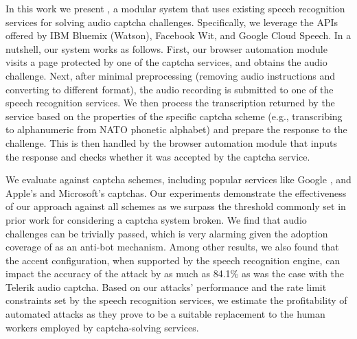 In this work we present \system, a modular system that uses existing speech recognition services
for solving audio captcha challenges. Specifically, we leverage the
APIs offered by IBM Bluemix (Watson), Facebook Wit, and Google Cloud Speech. In a nutshell, our system works as
follows. First, our browser automation module visits a page protected by one of the captcha services,
and obtains the audio challenge. Next, after minimal preprocessing (removing audio instructions and 
converting to different format), the audio recording is submitted 
to one of the speech recognition services. We then process the transcription returned by the service
based on the properties of the specific captcha scheme (e.g., transcribing to alphanumeric 
from NATO phonetic alphabet) and prepare the response to the challenge. This is then handled by
the browser automation module that inputs the response and checks whether it was accepted by the captcha
service.

We evaluate \system against \no captcha schemes, including popular services like Google \re,
and Apple's and Microsoft's captchas. Our experiments demonstrate the effectiveness of our approach
against all schemes as we surpass the threshold commonly set in prior work for considering
a captcha system broken. We find that \re audio challenges can be trivially passed, which is 
very alarming given the adoption coverage of \re as an anti-bot mechanism. Among other results, 
we also found that the accent configuration, when supported by the speech recognition engine, 
can impact the accuracy of the attack by as much as 84.1\% as was the case with the Telerik audio 
captcha. Based on our attacks' performance and the rate limit constraints set by the speech 
recognition services, we estimate the profitability of automated attacks as they prove to be 
a suitable replacement to the
human workers employed by captcha-solving services.


